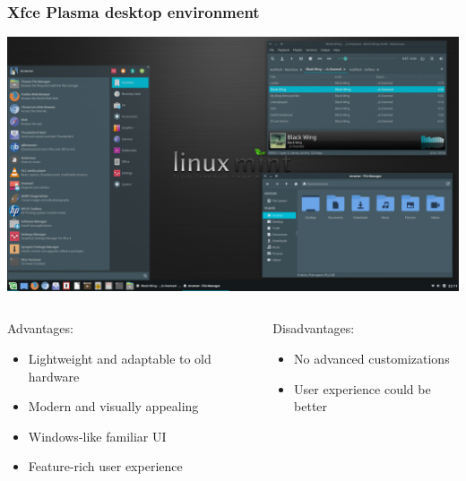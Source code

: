 \begin{frame}
	\frametitle{Xfce Plasma desktop environment}
	
	\begin{center}
		\includegraphics[width=.7\linewidth]{../graphics/desktop_examples/xfce.png}
	\end{center}%
	
	\vspace{-\baselineskip}
	
	\begin{columns}
		\begin{column}[t]{.7\linewidth}
			\begin{exampleblock}{Advantages:}
				\begin{itemize}
					\item Lightweight and adaptable to old hardware
					\item Modern and visually appealing
					\item Windows-like familiar UI
					\item Feature-rich user experience
				\end{itemize}
			\end{exampleblock}
		\end{column}
		\hfill
		\begin{column}[t]{.28\linewidth}
			\begin{alertblock}{Disadvantages:}
				\begin{itemize}
					\item No advanced customizations
					\item User experience could be better
				\end{itemize}
			\end{alertblock}
		\end{column}
	\end{columns}
	\hfill
\end{frame}
